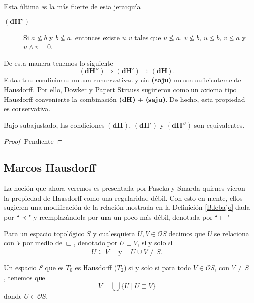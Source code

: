 Esta última es la más fuerte de esta jerarquía

\begin{description}
    \item[$\mathbf{(dH'')}$] Si $a\nleq b$ y $b\nleq a$, entonces existe $u, v$ tales que $u\nleq a$, $v\nleq b$, $u\leq b$, $v\leq a$ y $u\wedge v=0$.  
\end{description}

De esta manera tenemos lo siguiente
\[
\mathbf{(dH'')}\Rightarrow \mathbf{(dH')}\Rightarrow \mathbf{(dH)}.
\]
Estas tres condiciones no son conservativas y sin \textbf{(saju)} no son suficientemente Hausdorff. Por ello, Dowker y Papert Strauss sugirieron como un axioma tipo Hausdorff conveniente la combinación \textbf{(dH)} + \textbf{(saju)}. De hecho, esta propiedad es conservativa. 

\begin{prop}\label{Proposicion2.3.1}
    Bajo subajustado, las condiciones $\mathbf{(dH)}$, $\mathbf{(dH')}$ y $\mathbf{(dH'')}$ son equivalentes.
\end{prop}

\begin{proof}
    Pendiente
\end{proof}

\subsection{Marcos Hausdorff}

La noción que ahora veremos es presentada por Paseka y Smarda quienes vieron la propiedad de Hausdorff como una regularidad débil. Con esto en mente, ellos sugieren una modificación de la relación mostrada en la Definición \ref{Bdebajo} dada por ``$\prec$" y reemplazándola por una un poco más débil, denotada por ``$\sqsubset$" 

\begin{dfn}\label{sqsubset}
    Para un espacio topológico $S$ y cualesquiera $U, V\in \mathcal{O}S$ decimos que $U$ se relaciona con $V$ por medio de $\sqsubset$, denotado por $U\sqsubset V$, si y solo si 
    \[
    U\subseteq V\quad\mbox{ y }\quad \overline{U}\cup V\neq S.
    \]
\end{dfn}

\begin{prop}\label{Proposicion3.2}
    Un espacio $S$ que es $T_0$ es Hausdorff ($T_2$) si y solo si para todo $V\in \mathcal{O}S$, con $V\neq S$, tenemos que 
    \[
    V=\bigcup\{U\mid U\sqsubset V\}
    \]
    donde $U\in \mathcal{O}S$.
\end{prop}

